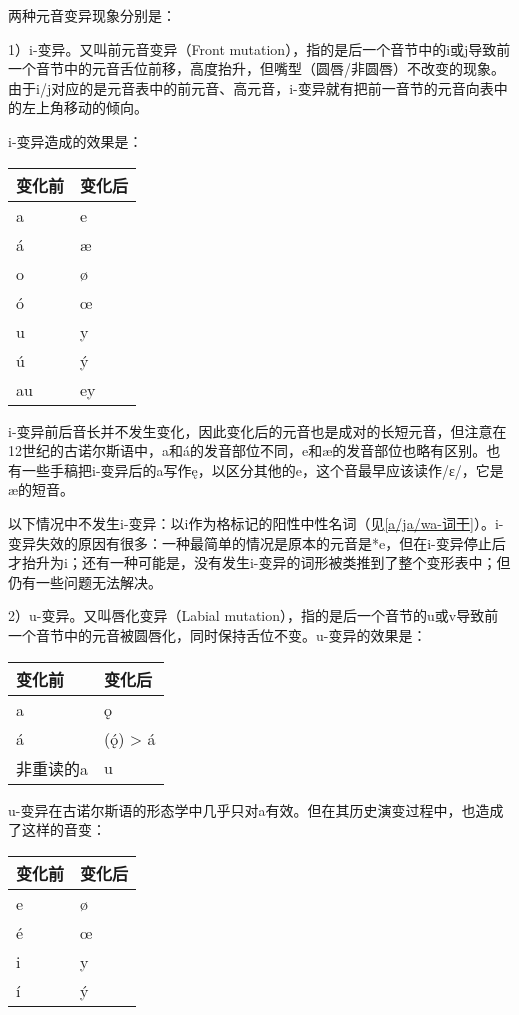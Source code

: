 两种元音变异现象分别是：

1）i-变异。又叫前元音变异（Front
mutation），指的是后一个音节中的i或j导致前一个音节中的元音舌位前移，高度抬升，但嘴型（圆唇/非圆唇）不改变的现象。由于i/j对应的是元音表中的前元音、高元音，i-变异就有把前一音节的元音向表中的左上角移动的倾向。

i-变异造成的效果是：

\begin{longtable}{ll}
  \toprule
  变化前 & 变化后 \\
  \midrule
  \endhead
  \bottomrule
  \endfoot
  a   & e   \\
  á   & æ   \\
  o   & ø   \\
  ó   & œ   \\
  u   & y   \\
  ú   & ý   \\
  au  & ey  \\
\end{longtable}

i-变异前后音长并不发生变化，因此变化后的元音也是成对的长短元音，但注意在12世纪的古诺尔斯语中，a和á的发音部位不同，e和æ的发音部位也略有区别。也有一些手稿把i-变异后的a写作ę，以区分其他的e，这个音最早应该读作/ɛ/，它是æ的短音。

以下情况中不发生i-变异：以i作为格标记的阳性中性名词（见\ref{a/ja/wa-词干}）。i-变异失效的原因有很多：一种最简单的情况是原本的元音是*e，但在i-变异停止后才抬升为i；还有一种可能是，没有发生i-变异的词形被类推到了整个变形表中；但仍有一些问题无法解决。

2）u-变异。又叫唇化变异（Labial
mutation），指的是后一个音节的u或v导致前一个音节中的元音被圆唇化，同时保持舌位不变。u-变异的效果是：

\begin{longtable}{ll}
  \toprule
  变化前   & 变化后                  \\
  \midrule
  \endhead
  \bottomrule
  \endfoot
  a     & ǫ                    \\
  á     & (ǫ́) \textgreater{} á \\
  非重读的a & u                    \\
\end{longtable}

u-变异在古诺尔斯语的形态学中几乎只对a有效。但在其历史演变过程中，也造成了这样的音变：

\begin{longtable}{ll}
  \toprule
  变化前 & 变化后 \\
  \midrule
  \endhead
  \bottomrule
  \endfoot
  e   & ø   \\
  é   & œ   \\
  i   & y   \\
  í   & ý   \\
\end{longtable}

